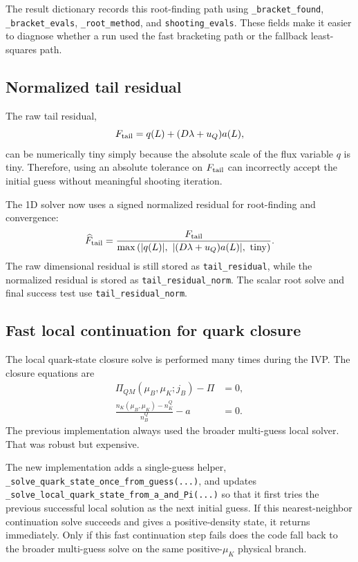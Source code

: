 \documentclass[11pt]{article}
\begin{document}
The result dictionary records this root-finding path using
\texttt{\_bracket\_found}, \texttt{\_bracket\_evals}, \texttt{\_root\_method},
and \texttt{shooting\_evals}. These fields make it easier to diagnose whether a
run used the fast bracketing path or the fallback least-squares path.

\subsection{Normalized tail residual}
The raw tail residual,
\[
F_{\rm tail} = q(L) + (D\lambda+u_Q)a(L),
\]
can be numerically tiny simply because the absolute scale of the flux variable
$q$ is tiny. Therefore, using an absolute tolerance on $F_{\rm tail}$ can
incorrectly accept the initial guess without meaningful shooting iteration.

The 1D solver now uses a signed normalized residual for root-finding and
convergence:
\[
\widehat F_{\rm tail}
= \frac{F_{\rm tail}}
       {\max\left(|q(L)|,\ |(D\lambda+u_Q)a(L)|,\ {\rm tiny}\right)}.
\]
The raw dimensional residual is still stored as \texttt{tail\_residual}, while
the normalized residual is stored as \texttt{tail\_residual\_norm}. The scalar
root solve and final success test use \texttt{tail\_residual\_norm}.

\subsection{Fast local continuation for quark closure}
The local quark-state closure solve is performed many times during the IVP. The
closure equations are
\begin{align}
\Pi_{QM}(\mu_B,\mu_K; j_B) - \Pi &= 0,\\
\frac{n_K(\mu_B,\mu_K)-n_K^Q}{n_B^Q} - a &= 0.
\end{align}
The previous implementation always used the broader multi-guess local solver.
That was robust but expensive.

The new implementation adds a single-guess helper,
\texttt{\_solve\_quark\_state\_once\_from\_guess(...)}, and updates
\texttt{\_solve\_local\_quark\_state\_from\_a\_and\_Pi(...)} so that it first
tries the previous successful local solution as the next initial guess. If this
nearest-neighbor continuation solve succeeds and gives a positive-density state,
it returns immediately. Only if this fast continuation step fails does the code
fall back to the broader multi-guess solve on the same positive-$\mu_K$
physical branch.
\end{document}
